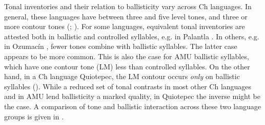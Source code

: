 \documentclass[output=paper]{langscibook}
\begin{document}
\begin{table}
\caption{A summary of ballisticity distribution across syllable and phonation types in Comaltepec Ch}
\label{tab:dobui:summary2}
\end{table}








Tonal inventories and their relation to ballisticity vary across Ch languages. In general, these languages have between three and five level tones, and three or more contour tones (\citealt{Rensch1968}; \citealt{Suárez1983}). For some languages, equivalent tonal inventories are attested both in ballistic and controlled syllables, e.g. in Palantla \citep{Merrifield1968}. In others, e.g. in Ozumacín \citep{Rupp2012}, fewer tones combine with ballistic syllables. The latter case appears to be more common. This is also the case for AMU ballistic syllables, which have one contour tone (LM) less than controlled syllables. On the other hand, in a Ch language Quiotepec, the LM contour occurs \textit{only} on ballistic syllables (\citealt{GardnerMerrifield1990}). While a reduced set of tonal contrasts in most other Ch languages and in AMU lend ballisticity a marked quality, in Quiotepec the inverse might be the case. A comparison of tone and ballistic interaction across these two language groups is given in .
\end{document}
